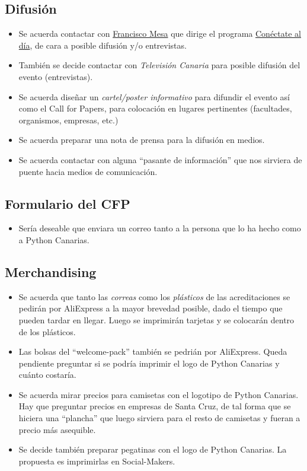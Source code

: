 \documentclass[a4paper, 12pt]{article}
\begin{document}
\subsection*{Difusión}

\begin{itemize}
    \item Se acuerda contactar con \href{https://twitter.com/franciscomesa}{Francisco Mesa} que dirige el programa \href{https://twitter.com/Conectatealdia?lang=es}{Conéctate al día}, de cara a posible difusión y/o entrevistas.
    \item También se decide contactar con \textit{Televisión Canaria} para posible difusión del evento (entrevistas).
    \item Se acuerda diseñar un \textit{cartel/poster informativo} para difundir el evento así como el Call for Papers, para colocación en lugares pertinentes (facultades, organismos, empresas, etc.)
    \item Se acuerda preparar una nota de prensa para la difusión en medios.
    \item Se acuerda contactar con alguna ``pasante de información'' que nos sirviera de puente hacia medios de comunicación.
\end{itemize}

\subsection*{Formulario del CFP}

\begin{itemize}
    \item Sería deseable que enviara un correo tanto a la persona que lo ha hecho como a Python Canarias.
\end{itemize}

\subsection*{Merchandising}

\begin{itemize}
    \item Se acuerda que tanto las \textit{correas} como los \textit{plásticos} de las acreditaciones se pedirán por AliExpress a la mayor brevedad posible, dado el tiempo que pueden tardar en llegar. Luego se imprimirán tarjetas y se colocarán dentro de los plásticos.
    \item Las bolsas del ``welcome-pack'' también se pedrián por AliExpress. Queda pendiente preguntar si se podría imprimir el logo de Python Canarias y cuánto costaría.
    \item Se acuerda mirar precios para camisetas con el logotipo de Python Canarias. Hay que preguntar precios en empresas de Santa Cruz, de tal forma que se hiciera una ``plancha'' que luego sirviera para el resto de camisetas y fueran a precio más asequible.
    \item Se decide también preparar pegatinas con el logo de Python Canarias. La propuesta es imprimirlas en Social-Makers.
\end{itemize}
\end{document}
